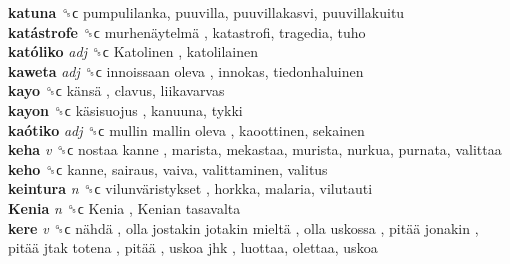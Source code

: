 \textbf{katuna} ␝ϲ  pumpulilanka, puuvilla, puuvillakasvi, puuvillakuitu  \\
\textbf{katástrofe} ␝ϲ   murhenäytelmä , katastrofi, tragedia, tuho  \\
\textbf{katóliko} \emph{adj}  ␝ϲ   Katolinen , katolilainen  \\
\textbf{kaweta} \emph{adj}  ␝ϲ   innoissaan oleva , innokas, tiedonhaluinen  \\
\textbf{kayo} ␝ϲ   känsä , clavus, liikavarvas  \\
\textbf{kayon} ␝ϲ   käsisuojus , kanuuna, tykki  \\
\textbf{kaótiko} \emph{adj}  ␝ϲ   mullin mallin oleva , kaoottinen, sekainen  \\
\textbf{keha} \emph{v}  ␝ϲ   nostaa kanne , marista, mekastaa, murista, nurkua, purnata, valittaa  \\
\textbf{keho} ␝ϲ  kanne, sairaus, vaiva, valittaminen, valitus  \\
\textbf{keintura} \emph{n}  ␝ϲ   vilunväristykset , horkka, malaria, vilutauti  \\
\textbf{Kenia} \emph{n}  ␝ϲ   Kenia ,  Kenian tasavalta   \\
\textbf{kere} \emph{v}  ␝ϲ   nähdä ,  olla jostakin jotakin mieltä ,  olla uskossa ,  pitää jonakin ,  pitää jtak totena ,  pitää ,  uskoa jhk , luottaa, olettaa, uskoa  \\
